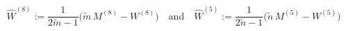 \begin{equation}
\hat{W}^{(8)} := \frac{1}{2\tilde{m}-1}\Big(\tilde{m}\, M^{(8)} - W^{(8)}\Big)\quad \text{and}\quad
\hat{W}^{(5)} := \frac{1}{2\tilde{n}-1}\Big(\tilde{n}\, M^{(5)} - W^{(5)}\Big)
\end{equation}

